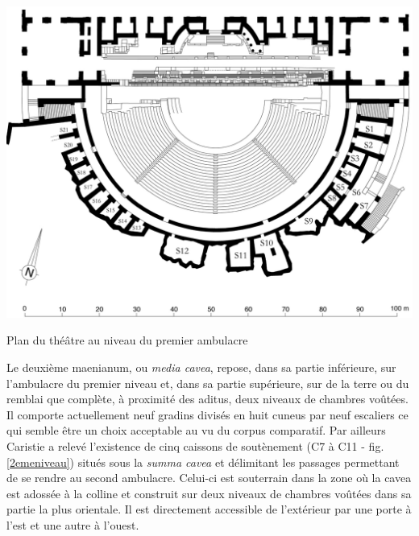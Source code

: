 	\begin{figureth}
		\includegraphics[width=\linewidth]{images/1erniveau}
		\caption[Vue de dessus - 1er niveau]{Plan du théâtre au niveau du premier ambulacre \cite[Pl. XVII]{orangePl}}
		\label{1erniveau}
	\end{figureth}		
		
Le deuxième \gls{maenianum}, ou \textit{media cavea}, repose, dans sa partie inférieure, sur l'\gls{ambulacre} du premier niveau et, dans sa partie supérieure, sur de la terre ou du remblai que complète, à proximité des \gls{aditus}, deux niveaux de chambres voûtées. Il comporte actuellement neuf gradins divisés en huit \gls{cuneus} par neuf escaliers ce qui semble être un choix acceptable au vu du corpus comparatif. Par ailleurs Caristie a relevé l'existence de cinq caissons de soutènement (C7 à C11 - fig. \ref{2emeniveau}) situés sous la \textit{summa cavea} et délimitant les passages permettant de se rendre au second \gls{ambulacre}. Celui-ci est souterrain dans la zone où la \gls{cavea} est adossée à la colline et construit sur deux niveaux de chambres voûtées dans sa partie la plus orientale. Il est directement accessible de l'extérieur par une porte à l'est et une autre à l'ouest.
		
